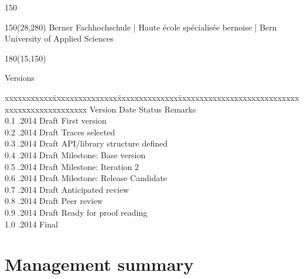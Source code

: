 \documentclass[
	a4paper,					10pt,							twoside,					openright,				notitlepage,			parskip=half,			]{scrreprt}
\begin{document}
\begin{titlepage}
\begin{flushleft}
\begin{textblock}{150}
\end{textblock}
\end{flushleft}

\begin{textblock}{150}(28,280)
\noindent 
\color{bfhgrey}\fontsize{9pt}{10pt}\selectfont
Berner Fachhochschule | Haute école spécialisée bernoise | Bern University of Applied Sciences
\color{black}\selectfont
\end{textblock}


\end{titlepage}

\clearpage{}			
\clearpage{}

\begin{textblock}{180}(15,150)
\color{black}
\begin{huge}
Versions
\end{huge}
\vspace{10mm}

\fontsize{10pt}{18pt}\selectfont
\begin{tabbing}
xxxxxxxxxxx\=xxxxxxxxxxxxxxx\=xxxxxxxxxxxxxx\=xxxxxxxxxxxxxxxxxxxxxxxxxxxxxxxxxxxxxxxxxxxxxxx \kill
Version	\> Date	\> Status		\> Remarks		\\
0.1	.2014	\> Draft		\> First version	\\	
0.2	.2014	\> Draft		\> Traces selected	\\	
0.3	.2014	\> Draft		\> API/library structure defined	\\	
0.4	.2014	\> Draft		\> Milestone: Base version	\\	
0.5	.2014	\> Draft		\> Milestone: Iteration 2	\\	
0.6	.2014	\> Draft		\> Milestone: Release Candidate	\\	
0.7	.2014	\> Draft		\> Anticipated review	\\	
0.8	.2014	\> Draft		\> Peer review	\\	
0.9	.2014	\> Draft		\> Ready for proof reading	\\	
1.0	.2014	\> Final	\>   	\\
\end{tabbing}

\end{textblock}
\clearpage{}
\cleardoubleemptypage
\setcounter{page}{1}
\cleardoublepage
{} 
{}
\clearpage{}\chapter*{Management summary}
\label{chap:managementSummary}
\end{document}
